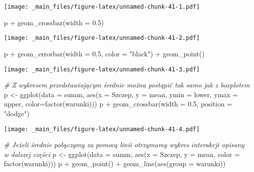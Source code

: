 \documentclass[
]{book}
\newenvironment{Shaded}{\begin{snugshade}}{\end{snugshade}}
\newcommand{\AttributeTok}[1]{\textcolor[rgb]{0.77,0.63,0.00}{#1}}
\newcommand{\CommentTok}[1]{\textcolor[rgb]{0.56,0.35,0.01}{\textit{#1}}}
\newcommand{\FloatTok}[1]{\textcolor[rgb]{0.00,0.00,0.81}{#1}}
\newcommand{\FunctionTok}[1]{\textcolor[rgb]{0.00,0.00,0.00}{#1}}
\newcommand{\NormalTok}[1]{#1}
\newcommand{\OtherTok}[1]{\textcolor[rgb]{0.56,0.35,0.01}{#1}}
\newcommand{\SpecialCharTok}[1]{\textcolor[rgb]{0.00,0.00,0.00}{#1}}
\newcommand{\StringTok}[1]{\textcolor[rgb]{0.31,0.60,0.02}{#1}}
\begin{document}
\texttt{[image: \_main\_files/figure-latex/unnamed-chunk-41-1.pdf]}

\begin{Shaded}
\begin{Highlighting}[]
\NormalTok{p }\SpecialCharTok{+} \FunctionTok{geom\_crossbar}\NormalTok{(}\AttributeTok{width =} \FloatTok{0.5}\NormalTok{)}
\end{Highlighting}
\end{Shaded}

\texttt{[image: \_main\_files/figure-latex/unnamed-chunk-41-2.pdf]}

\begin{Shaded}
\begin{Highlighting}[]
\NormalTok{p }\SpecialCharTok{+} \FunctionTok{geom\_errorbar}\NormalTok{(}\AttributeTok{width =} \FloatTok{0.5}\NormalTok{, }\AttributeTok{color =} \StringTok{"black"}\NormalTok{) }\SpecialCharTok{+} \FunctionTok{geom\_point}\NormalTok{()}
\end{Highlighting}
\end{Shaded}

\texttt{[image: \_main\_files/figure-latex/unnamed-chunk-41-3.pdf]}

\begin{Shaded}
\begin{Highlighting}[]
\CommentTok{\# Z wykresem przedstawiającym średnie można postąpić tak samo jak z boxplotem}
\NormalTok{p }\OtherTok{\textless{}{-}} \FunctionTok{ggplot}\NormalTok{(}\AttributeTok{data =}\NormalTok{ summ, }\FunctionTok{aes}\NormalTok{(}\AttributeTok{x =}\NormalTok{ Szczep, }\AttributeTok{y =}\NormalTok{ mean, }\AttributeTok{ymin =}\NormalTok{ lower, }\AttributeTok{ymax =}\NormalTok{ upper, }
                             \AttributeTok{color=}\FunctionTok{factor}\NormalTok{(warunki)))}
\NormalTok{p }\SpecialCharTok{+} \FunctionTok{geom\_crossbar}\NormalTok{(}\AttributeTok{width =} \FloatTok{0.5}\NormalTok{, }\AttributeTok{position =} \StringTok{"dodge"}\NormalTok{)}
\end{Highlighting}
\end{Shaded}

\texttt{[image: \_main\_files/figure-latex/unnamed-chunk-41-4.pdf]}

\begin{Shaded}
\begin{Highlighting}[]
\CommentTok{\# Jeżeli średnie połączymy za pomocą linii otrzymamy wykres interakcji opisany w dalszej części}
\NormalTok{p }\OtherTok{\textless{}{-}} \FunctionTok{ggplot}\NormalTok{(}\AttributeTok{data =}\NormalTok{ summ, }\FunctionTok{aes}\NormalTok{(}\AttributeTok{x =}\NormalTok{ Szczep, }\AttributeTok{y =}\NormalTok{ mean, }\AttributeTok{color =} \FunctionTok{factor}\NormalTok{(warunki)))}
\NormalTok{p }\SpecialCharTok{+} \FunctionTok{geom\_point}\NormalTok{() }\SpecialCharTok{+} \FunctionTok{geom\_line}\NormalTok{(}\FunctionTok{aes}\NormalTok{(}\AttributeTok{group =}\NormalTok{ warunki))}
\end{Highlighting}
\end{Shaded}
\end{document}

